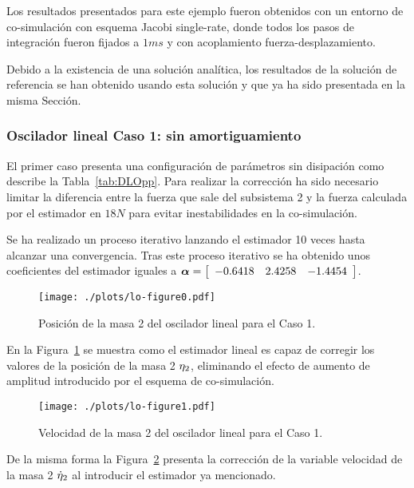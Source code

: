 Los resultados presentados para este ejemplo fueron obtenidos con un entorno de co-simulación con esquema Jacobi single-rate, donde todos los pasos de integración fueron fijados a $1\unit{ms}$ y con acoplamiento fuerza-desplazamiento. 

Debido a la existencia de una solución analítica, los resultados de la solución de referencia se han obtenido usando esta solución y que ya ha sido presentada en la misma Sección.

\subsubsection{Oscilador lineal Caso 1: sin amortiguamiento}
\label{subsec:res_oscilador1}

El primer caso presenta una configuración  de parámetros sin disipación como describe la Tabla~\ref{tab:DLOpp}.
Para realizar la corrección ha sido necesario limitar la diferencia entre la fuerza que sale del subsistema 2 y la fuerza calculada por el estimador en $18\unit{N}$ para evitar inestabilidades en la co-simulación.

Se ha realizado un proceso iterativo lanzando el estimador 10 veces hasta alcanzar una convergencia.
Tras este proceso iterativo se ha obtenido unos coeficientes del estimador iguales a $\coefficients = \sqbr{\matr{ccc}{-0.6418  & 2.4258 & -1.4454}}$.

\begin{figure}[ht!]\centering
	\texttt{[image: ./plots/lo-figure0.pdf]}
	\caption{Posición de la masa 2 del oscilador lineal para el Caso 1.}
	\label{fig:OsciladorLinealPos1}
\end{figure}

En la Figura~\ref{fig:OsciladorLinealPos1} se muestra como el estimador lineal es capaz de corregir los valores de la posición de la masa 2 $\displacement_2$, eliminando el efecto de aumento de amplitud introducido por el esquema de co-simulación.


\begin{figure}[ht!]\centering
	\texttt{[image: ./plots/lo-figure1.pdf]}
	\caption{Velocidad de la masa 2 del oscilador lineal para el Caso 1.}
	\label{fig:OsciladorLinealVel1}
\end{figure}

De la misma forma la Figura~\ref{fig:OsciladorLinealVel1} presenta la corrección de la variable velocidad de la masa 2 $\velocity_2$ al introducir el estimador ya mencionado.

